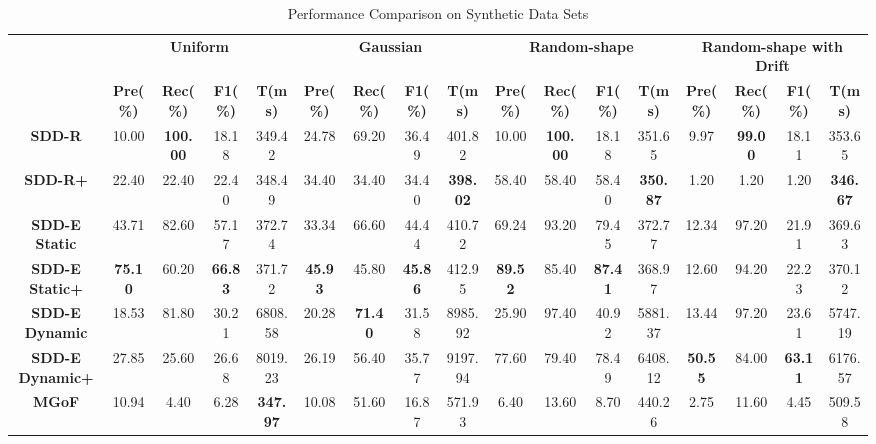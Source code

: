 \documentclass[10pt,conference,letterpaper]{article}
\begin{document}
		\begin{table}
			\centering
			\caption{Performance Comparison on Synthetic Data Sets}
			\label{tab:performance-synthetic}
			\footnotesize
			\begin{tabular}{|c|c|c|c|c|c|c|c|c|c|c|c|c|c|c|c|c|}
				\hline
				\multirow{2}{*}{\textbf{}} & \multicolumn{4}{c|}{\textbf{Uniform}} & \multicolumn{4}{c|}{\textbf{Gaussian}} & \multicolumn{4}{c|}{\textbf{Random-shape}} & \multicolumn{4}{c|}{\textbf{Random-shape with Drift}} \\ \cline{2-17} 
				& \textbf{Pre(\%)} & \textbf{Rec(\%)} & \textbf{F1(\%)} & \textbf{T(ms)} & \textbf{Pre(\%)} & \textbf{Rec(\%)} & \textbf{F1(\%)} & \textbf{T(ms)} & \textbf{Pre(\%)} & \textbf{Rec(\%)} & \textbf{F1(\%)} & \textbf{T(ms)} & \textbf{Pre(\%)} & \textbf{Rec(\%)} & \textbf{F1(\%)} & \textbf{T(ms)} \\ \hline
				\textbf{SDD-R} & 10.00 & \textbf{100.00} & 18.18 & 349.42 & 24.78 & 69.20 & 36.49 & 401.82 & 10.00 & \textbf{100.00} & 18.18 & 351.65 & 9.97 & \textbf{99.00} & 18.11 & 353.65 \\ \hline
				\textbf{SDD-R+} & 22.40 & 22.40 & 22.40 & 348.49 & 34.40 & 34.40 & 34.40 & \textbf{398.02} & 58.40 & 58.40 & 58.40 & \textbf{350.87} & 1.20 & 1.20 & 1.20 & \textbf{346.67} \\ \hline
				\textbf{SDD-E Static} & 43.71 & 82.60 & 57.17 & 372.74 & 33.34 & 66.60 & 44.44 & 410.72 & 69.24 & 93.20 & 79.45 & 372.77 & 12.34 & 97.20 & 21.91 & 369.63 \\ \hline
				\textbf{SDD-E Static+} & \textbf{75.10} & 60.20 & \textbf{66.83} & 371.72 & \textbf{45.93} & 45.80 & \textbf{45.86} & 412.95 & \textbf{89.52} & 85.40 & \textbf{87.41} & 368.97 & 12.60 & 94.20 & 22.23 & 370.12 \\ \hline
				\textbf{SDD-E Dynamic} & 18.53 & 81.80 & 30.21 & 6808.58 & 20.28 & \textbf{71.40} & 31.58 & 8985.92 & 25.90 & 97.40 & 40.92 & 5881.37 & 13.44 & 97.20 & 23.61 & 5747.19 \\ \hline
				\textbf{SDD-E Dynamic+} & 27.85 & 25.60 & 26.68 & 8019.23 & 26.19 & 56.40 & 35.77 & 9197.94 & 77.60 & 79.40 & 78.49 & 6408.12 & \textbf{50.55} & 84.00 & \textbf{63.11} & 6176.57 \\ \hline
				\textbf{MGoF} & 10.94 & 4.40 & 6.28 & \textbf{347.97} & 10.08 & 51.60 & 16.87 & 571.93 & 6.40 & 13.60 & 8.70 & 440.26 & 2.75 & 11.60 & 4.45 & 509.58 \\ \hline
			\end{tabular}
			

\end{table}
\end{document}
